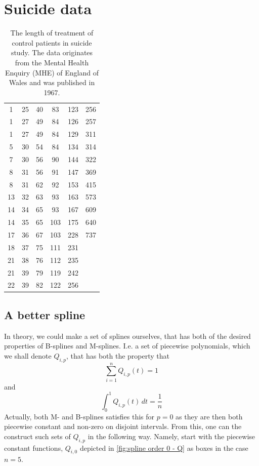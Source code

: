 \documentclass[../Thesis.tex]{subfiles}
\begin{document}
\section{Suicide data}
\begin{table}[H]
    \centering
    \begin{tabular}{cccccc}
1 & 25 & 40 & 83 & 123 & 256 \\
1 & 27 & 49 & 84 & 126 & 257 \\
1 & 27 & 49 & 84 & 129 & 311 \\
5 & 30 & 54 & 84 & 134 & 314 \\
7 & 30 & 56 & 90 & 144 & 322 \\
8 & 31 & 56 & 91 & 147 & 369 \\
8 & 31 & 62 & 92 & 153 & 415 \\
13 & 32 & 63 & 93 & 163 & 573 \\
14 & 34 & 65 & 93 & 167 & 609 \\
14 & 35 & 65 & 103 & 175 & 640 \\
17 & 36 & 67 & 103 & 228 & 737 \\
18 & 37 & 75 & 111 & 231 \\
21 & 38 & 76 & 112 & 235 \\
21 & 39 & 79 & 119 & 242 \\
22 & 39 & 82 & 122 & 256
    \end{tabular}
    \caption{The length of treatment of control patients in suicide study. The data originates from the Mental Health Enquiry (MHE) of England of Wales and was published in 1967.}
    \label{tab:suicide data}
\end{table}

\newpage


\subsection{A better spline}\label{sec:A family of better splines for Copula entropy estimation}
In theory, we could make a set of splines ourselves, that has both of the desired properties of B-splines and M-splines. I.e. a set of piecewise polynomials, which we shall denote $Q_{i,p}$, that has both the property that
$$\sum_{i = 1}^n Q_{i,p} (t) = 1$$
and
$$\int_{0}^{1} Q_{i,p} (t) \, dt = \frac{1}{n} $$
Actually, both M- and B-splines satisfies this for $p = 0$ as they are then both piecewise constant and non-zero on disjoint intervals. From this, one can the construct such sets of $Q_{i,p}$ in the following way. Namely, start with the piecewise constant functions, $Q_{i,0}$ depicted in \autoref{fig:spline order 0 - Q} as boxes in the case $n = 5$.
\end{document}
